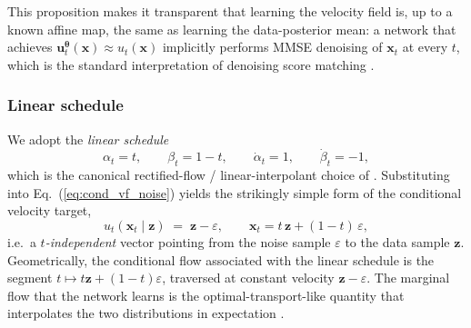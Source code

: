\documentclass[11pt]{article}
\newcommand{\e}{\varepsilon}
\DeclareRobustCommand{\uvec}{\bm{u}}
\DeclareRobustCommand{\xvec}{\bm{x}}
\DeclareRobustCommand{\zvec}{\bm{z}}
\DeclareRobustCommand{\thetavec}{\bm{\theta}}
\theoremstyle{definition}
\begin{document}
This proposition makes it transparent that learning the velocity field is, up to a known affine map, the same as learning the data-posterior mean: a network that achieves $\uvec_t^{\thetavec}(\xvec)\approx u_t(\xvec)$ implicitly performs MMSE denoising of $\xvec_t$ at every $t$, which is the standard interpretation of denoising score matching \cite{vincent2011dsm,karras2022elucidating}.

\subsubsection{Linear schedule}

We adopt the \emph{linear schedule}
\begin{equation}
  \boxed{\;\alpha_t = t,\qquad \beta_t = 1-t,\qquad \dot\alpha_t=1,\qquad \dot\beta_t=-1,\;}
  \label{eq:linear_schedule}
\end{equation}
which is the canonical rectified-flow / linear-interpolant choice of \cite{liu2022rectified,albergo2023interpolants,lipman2023flowmatching}. Substituting into Eq.~(\ref{eq:cond_vf_noise}) yields the strikingly simple form of the conditional velocity target,
\begin{equation}
  u_t(\xvec_t\mid\zvec) \;=\; \zvec - \e,
  \qquad
  \xvec_t = t\,\zvec + (1-t)\,\e,
  \label{eq:linear_target}
\end{equation}
i.e.\ a \emph{$t$-independent} vector pointing from the noise sample $\e$ to the data sample $\zvec$. Geometrically, the conditional flow associated with the linear schedule is the segment $t\mapsto t\zvec+(1-t)\e$, traversed at constant velocity $\zvec-\e$. The marginal flow that the network learns is the optimal-transport-like quantity that interpolates the two distributions in expectation \cite{liu2022rectified}.
\end{document}
